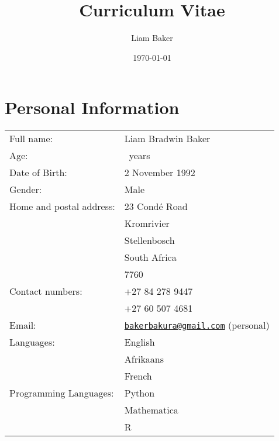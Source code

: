 \documentclass{article}
\author{Liam Baker}
\title{Curriculum Vitae}
\date{\today}
\newcommand{\email}[1]{\href{mailto:#1}{\texttt{#1}}}
\begin{document}
 \maketitle


\section{Personal Information}
\begin{center} \begin{tabular}{ll}
	Full name: 								& Liam Bradwin Baker \\
	Age: 											& \myyears~years \\
	Date of Birth:						& 2 November 1992 \\
	Gender: 									& Male \\
	Home and postal address:	& 23 Condé Road \\
														& Kromrivier \\
														& Stellenbosch \\
														& South Africa \\
														& 7760 \\
	Contact numbers:					& +27 84 278 9447 \\
														& +27 60 507 4681 \\
	Email:										& \email{bakerbakura@gmail.com} (personal)\\
	Languages:								& English \\
														& \footnotesize{Afrikaans} \\
														& \tiny{French} \\
	Programming Languages:		& Python \\
														& Mathematica \\
														& R
\end{tabular} \end{center}
\end{document}
